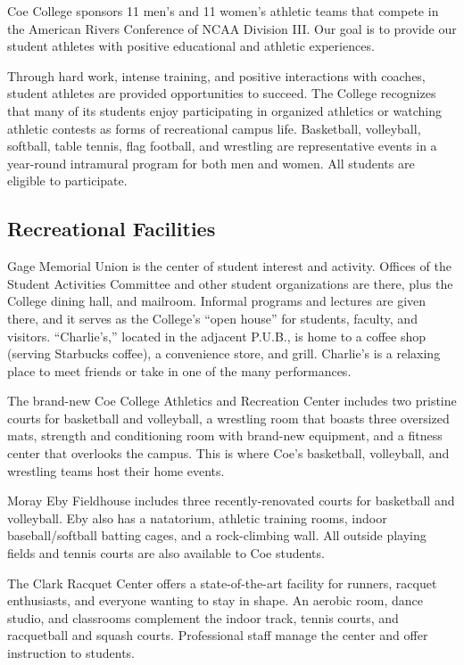 \documentclass[
  letterpaper,
]{scrbook}
\begin{document}
Coe College sponsors 11 men's and 11 women's athletic teams that compete
in the American Rivers Conference of NCAA Division III. Our goal is to
provide our student athletes with positive educational and athletic
experiences.

Through hard work, intense training, and positive interactions with
coaches, student athletes are provided opportunities to succeed. The
College recognizes that many of its students enjoy participating in
organized athletics or watching athletic contests as forms of
recreational campus life. Basketball, volleyball, softball, table
tennis, flag football, and wrestling are representative events in a
year-round intramural program for both men and women. All students are
eligible to participate.

\hypertarget{recreational-facilities}{%
\subsection{Recreational Facilities}\label{recreational-facilities}}

Gage Memorial Union is the center of student interest and activity.
Offices of the Student Activities Committee and other student
organizations are there, plus the College dining hall, and mailroom.
Informal programs and lectures are given there, and it serves as the
College's ``open house'' for students, faculty, and visitors.
``Charlie's,'' located in the adjacent P.U.B., is home to a coffee shop
(serving Starbucks coffee), a convenience store, and grill. Charlie's is
a relaxing place to meet friends or take in one of the many
performances.

The brand-new Coe College Athletics and Recreation Center includes two
pristine courts for basketball and volleyball, a wrestling room that
boasts three oversized mats, strength and conditioning room with
brand-new equipment, and a fitness center that overlooks the campus.
This is where Coe's basketball, volleyball, and wrestling teams host
their home events.

Moray Eby Fieldhouse includes three recently-renovated courts for
basketball and volleyball. Eby also has a natatorium, athletic training
rooms, indoor baseball/softball batting cages, and a rock-climbing wall.
All outside playing fields and tennis courts are also available to Coe
students.

The Clark Racquet Center offers a state-of-the-art facility for runners,
racquet enthusiasts, and everyone wanting to stay in shape. An aerobic
room, dance studio, and classrooms complement the indoor track, tennis
courts, and racquetball and squash courts. Professional staff manage the
center and offer instruction to students.
\end{document}
